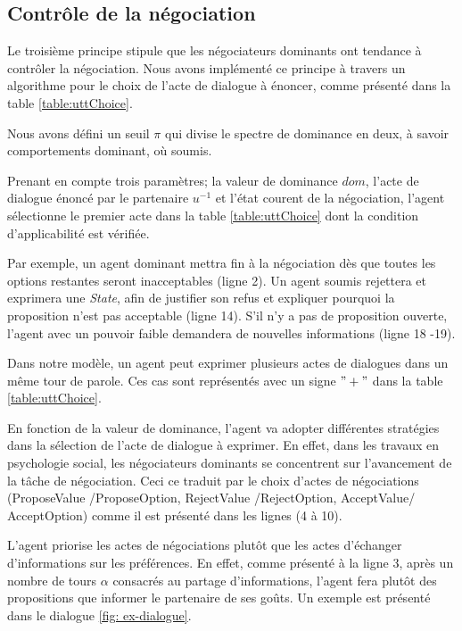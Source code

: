 	\subsection{Contrôle de la négociation}
	
	Le troisième principe stipule que les négociateurs dominants ont tendance à contrôler la négociation.
	Nous avons implémenté ce principe à travers un algorithme pour le choix de l'acte de dialogue à énoncer, comme présenté dans la table \ref{table:uttChoice}.
	
	Nous avons défini un seuil $\pi$  qui divise le spectre de dominance en deux, à savoir comportements dominant, où soumis.
	
	Prenant en compte trois paramètres; la valeur de dominance $dom$, l'acte de dialogue énoncé par le partenaire $u^{-1}$ et l'état courent de la négociation, l'agent sélectionne le premier acte dans la table \ref{table:uttChoice} dont la condition d'applicabilité est vérifiée.  
	
	
	Par exemple, un agent dominant mettra fin à la négociation dès que toutes les options restantes seront inacceptables (ligne 2). Un agent soumis rejettera et exprimera une \emph{State}, afin de justifier son refus et expliquer pourquoi la proposition n'est pas acceptable (ligne 14). S'il n'y a pas de proposition ouverte, l'agent avec un pouvoir faible demandera de nouvelles informations (ligne 18 -19).
	
	Dans notre modèle, un agent peut exprimer plusieurs actes de dialogues dans un même tour de parole. Ces cas sont représentés avec un signe $"+"$ dans la table \ref{table:uttChoice}.
	
	En fonction de la valeur de dominance, l'agent va adopter différentes stratégies dans la sélection de l'acte de dialogue à exprimer. En effet, dans les travaux en psychologie social, les négociateurs dominants se concentrent sur l'avancement de la tâche de négociation. Ceci ce traduit par le choix d'actes de négociations (ProposeValue /ProposeOption, RejectValue /RejectOption, AcceptValue/ AcceptOption) comme il est présenté dans les lignes (4 à 10).
	
	L'agent priorise les actes de négociations plutôt que les actes d'échanger d'informations sur les préférences. En effet, comme présenté à la ligne 3, après un nombre de tours $ \alpha $ consacrés au partage d'informations, l'agent fera plutôt des propositions que informer le partenaire de ses goûts. Un exemple est présenté dans le dialogue \ref{fig: ex-dialogue}.
	
